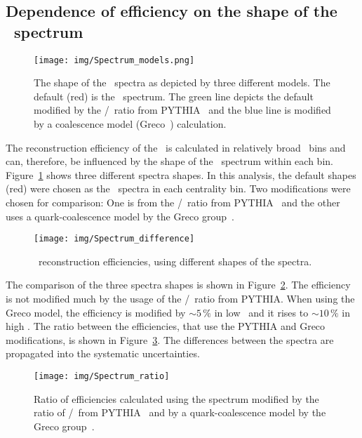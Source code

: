 \subsection{Dependence of efficiency on the shape of the \pt\ spectrum }
\begin{figure}[!htb]
\centering
\texttt{[image: img/Spectrum\_models.png]}

\caption[The shape of the \Lambdac\ spectra as depicted by three different models.]{\label{spectrum_models} The shape of the \Lambdac\ spectra as depicted by three different models. The default (red) is the \dzero\ spectrum. The green line depicts the default modified by the \Lambdac/\dzero\ ratio from PYTHIA~\cite{PYTHIA8} and the blue line is modified by a coalescence model (Greco~\cite{GrecoCoalescence}) calculation.}
\end{figure}

The reconstruction efficiency of the \Lambdac\ is calculated in relatively broad \pt\ bins and can, therefore, be influenced by the shape of the \pt\ spectrum within each bin. Figure~\ref{spectrum_models} shows three different spectra shapes. In this analysis, the default shapes (red) were chosen as the \dzero\ spectra in each centrality bin. Two modifications were chosen for comparison: One is from the \Lambdac/\dzero\ ratio from PYTHIA~\cite{PYTHIA8} and the other uses a quark-coalescence model by the Greco group~\cite{GrecoCoalescence}\@.

\begin{figure}[!htb]
\centering
\texttt{[image: img/Spectrum\_difference]}

\caption[\Lambdac\ reconstruction efficiencies, using different shapes of the spectra.]{\label{spectrum_diff} \Lambdac\ reconstruction efficiencies, using different shapes of the spectra.}
\end{figure}

The comparison of the three spectra shapes is shown in Figure~\ref{spectrum_diff}\@. The efficiency is not modified much by the usage of the \Lambdac/\dzero\ ratio from PYTHIA\@. When using the Greco model, the efficiency is modified by $\sim5\,\%$ in low \pt\ and it rises to $\sim10\,\%$ in high \pt\@. The ratio between the efficiencies, that use the PYTHIA and Greco modifications, is shown in Figure~\ref{spectrum_ratio}\@. The differences between the spectra are propagated into the systematic uncertainties.

\begin{figure}[!htb]
\centering
\texttt{[image: img/Spectrum\_ratio]}

\caption[Ratio of efficiencies calculated using the spectrum modified by the ratio of \Lambdac/\dzero\ from PYTHIA and by a quark-coalescence model by the Greco group.]{\label{spectrum_ratio} Ratio of efficiencies calculated using the spectrum modified by the ratio of \Lambdac/\dzero\ from PYTHIA~\cite{PYTHIA8} and by a quark-coalescence model by the Greco group~\cite{GrecoCoalescence}.}
\end{figure}

